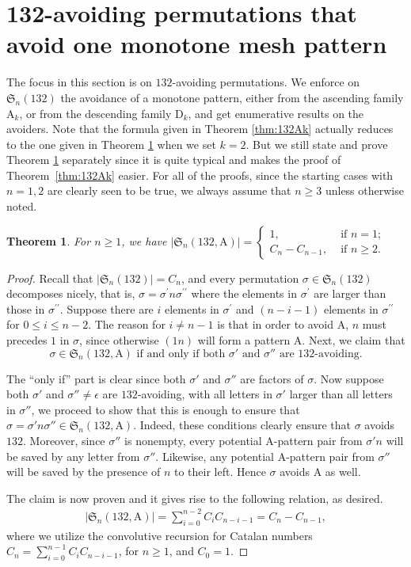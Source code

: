 \documentclass[12pt,reqno]{article}
\numberwithin{equation}{section}
\theoremstyle{plain}
\newtheorem{theorem}{Theorem}[section]
\theoremstyle{definition}
\def\fS{\mathfrak{S}}
\def\rA{\mathrm{A}}
\def\rD{\mathrm{D}}
\begin{document}
\section{132-avoiding permutations that avoid one monotone mesh pattern}\label{sec:132 and one monotone}


The focus in this section is on $132$-avoiding permutations. We enforce on $\fS_n(132)$ the avoidance of a monotone pattern, either from the ascending family $\rA_k$, or from the descending family $\rD_k$, and get enumerative results on the avoiders. Note that the formula given in Theorem \ref{thm:132Ak} actually reduces to the one given in Theorem \ref{thm:132P1} when we set $k=2$. But we still state and prove Theorem \ref{thm:132P1} separately since it is quite typical and makes the proof of Theorem~\ref{thm:132Ak} easier. For all of the proofs, since the starting cases with $n=1,2$ are clearly seen to be true, we always assume that $n\ge 3$ unless otherwise noted.

\begin{theorem}\label{thm:132P1}
	For $n\geq 1$, we have $|\fS_n(132, \rA)|=\left\{\begin{array}{lll}1,& \text{ if }n=1;\\C_n-C_{n-1},&\text{ if }n\geq 2.\end{array}\right.$ 
\end{theorem}

\begin{proof}
	Recall that $|\fS_n(132)|=C_n$, and every permutation $\sigma\in\fS_n(132)$ decomposes nicely, that is, $\sigma=\sigma^{\prime}n\sigma^{\prime \prime}$ where the elements in $\sigma^{\prime}$ are larger than those in $\sigma^{\prime \prime}$. Suppose there are $i$ elements in $\sigma^{\prime}$ and $(n-i-1)$ elements in $\sigma^{\prime \prime}$ for $0\leq i\leq n-2$. The reason for $i\neq n-1$ is that in order to avoid $\rA$, $n$ must precedes $1$ in $\sigma$, since otherwise $(1n)$ will form a pattern $\rA$. Next, we claim that 
	$$\text{$\sigma\in\fS_n(132,\rA)$ if and only if both $\sigma'$ and $\sigma''$ are $132$-avoiding.}$$

	The ``only if'' part is clear since both $\sigma'$ and $\sigma''$ are factors of $\sigma$. Now suppose both $\sigma'$ and $\sigma''\neq \epsilon$ are $132$-avoiding, with all letters in $\sigma'$ larger than all letters in $\sigma''$, we proceed to show that this is enough to ensure that $\sigma=\sigma' n\sigma''\in\fS_n(132,\rA)$. Indeed, these conditions clearly ensure that $\sigma$ avoids $132$. Moreover, since $\sigma''$ is nonempty, every potential $\rA$-pattern pair from $\sigma'n$ will be saved by any letter from $\sigma''$. Likewise, any potential $\rA$-pattern pair from $\sigma''$ will be saved by the presence of $n$ to their left. Hence $\sigma$ avoids $\rA$ as well. 

	The claim is now proven and it gives rise to the following relation, as desired.
	\begin{align*}
		|\fS_n(132, \rA)|=\sum_{i=0}^{n-2}C_iC_{n-i-1}=C_n-C_{n-1},
	\end{align*}
	where we utilize the convolutive recursion for Catalan numbers $C_n=\sum_{i=0}^{n-1}C_{i}C_{n-i-1}$, for $n\ge 1$, and $C_0=1$.
\end{proof}
\end{document}
